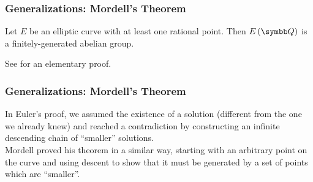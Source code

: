 \begin{frame}
\frametitle{Generalizations: Mordell's Theorem}
\begin{theorem}[Mordell, 1922]
Let \(E\) be an elliptic curve with at least one rational point. Then \(E\left(\rationals\right)\) is a finitely-generated abelian group.    
\end{theorem}

\vspace{1em}

See \cite{Gondi2018_MordellTheorem} for an elementary proof.
\end{frame}

\begin{frame}
\frametitle{Generalizations: Mordell's Theorem}
In Euler's proof, we assumed the existence of a solution (different from the one we already knew) and reached a contradiction by constructing an infinite descending chain of ``smaller'' solutions. \\[1em]

Mordell proved his theorem in a similar way, starting with an arbitrary point on the curve and using descent to show that it must be generated by a set of points which are ``smaller''.
\end{frame}
